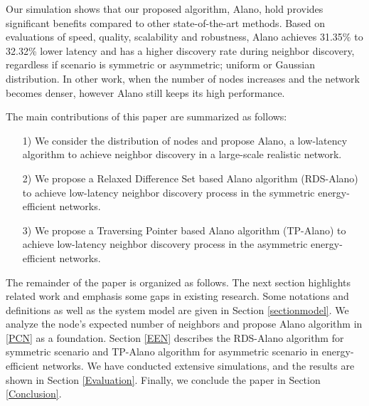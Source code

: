 Our simulation shows that our proposed algorithm, Alano,
hold provides significant benefits compared to other state-of-the-art methods.
Based on evaluations of speed, quality, scalability and robustness, 
Alano achieves 31.35\% to 32.32\% lower latency
and has a higher discovery rate during neighbor discovery, regardless if scenario is symmetric or asymmetric; uniform or Gaussian distribution.
In other work, when the number of nodes increases and the network becomes denser, however 
Alano still keeps its high performance. 


The main contributions of this paper are summarized as follows:
\begin{itemize}
\item[1)] We consider the distribution of nodes and propose Alano, 
a low-latency algorithm to achieve neighbor discovery in a large-scale realistic network.
\item[2)] We propose a Relaxed Difference Set based Alano algorithm (RDS-Alano) 
to achieve low-latency neighbor discovery process in the symmetric energy-efficient networks. 
\item[3)] We propose a Traversing Pointer based Alano algorithm (TP-Alano) to
achieve low-latency neighbor discovery process in the asymmetric energy-efficient networks. 
\end{itemize}


The remainder of the paper is organized as follows.
The next section highlights related work and 
emphasis some gaps in existing research.
Some notations and definitions as well as the system model are given in Section \ref{sectionmodel}. 
We analyze the node's expected number of neighbors and 
propose Alano algorithm in \ref{PCN} as a foundation.
Section \ref{EEN} describes the RDS-Alano algorithm for 
symmetric scenario and TP-Alano algorithm for asymmetric scenario 
in energy-efficient networks.
We have conducted extensive simulations, and the results are shown in Section
\ref{Evaluation}. Finally, we conclude the paper in Section
\ref{Conclusion}.




